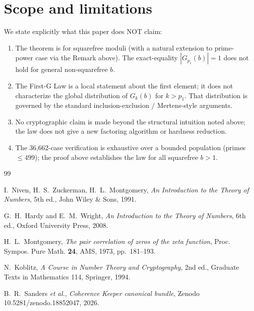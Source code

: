 \documentclass[11pt,reqno]{amsart}
\theoremstyle{plain}
\theoremstyle{definition}
\begin{document}
\section{Scope and limitations}

We state explicitly what this paper does NOT claim:

\begin{enumerate}
\item The theorem is for squarefree moduli (with a natural extension
to prime-power case via the Remark above). The exact-equality
$|G_{p_1}(b)| = 1$ does not hold for general non-squarefree $b$.
\item The First-G Law is a local statement about the first element;
it does not characterize the global distribution of $G_k(b)$ for
$k > p_1$. That distribution is governed by the standard
inclusion-exclusion / Mertens-style arguments.
\item No cryptographic claim is made beyond the structural intuition
noted above; the law does not give a new factoring algorithm or
hardness reduction.
\item The 36{,}662-case verification is exhaustive over a bounded
population (primes $\leq 499$); the proof above establishes the
law for all squarefree $b > 1$.
\end{enumerate}

\begin{thebibliography}{99}

I.~Niven, H.~S.~Zuckerman, H.~L.~Montgomery,
\emph{An Introduction to the Theory of Numbers},
5th ed., John Wiley \& Sons, 1991.

G.~H.~Hardy and E.~M.~Wright,
\emph{An Introduction to the Theory of Numbers},
6th ed., Oxford University Press, 2008.

H.~L.~Montgomery,
\emph{The pair correlation of zeros of the zeta function},
Proc. Sympos. Pure Math. \textbf{24}, AMS, 1973, pp.~181--193.

N.~Koblitz,
\emph{A Course in Number Theory and Cryptography},
2nd ed., Graduate Texts in Mathematics 114, Springer, 1994.

B.~R.~Sanders \emph{et al.},
\emph{Coherence Keeper canonical bundle},
Zenodo 10.5281/zenodo.18852047, 2026.

\end{thebibliography}
\end{document}
